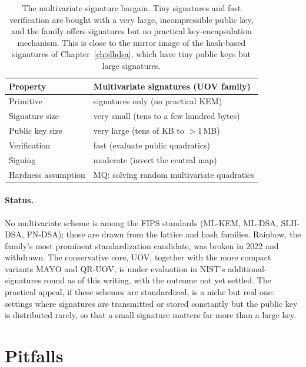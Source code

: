 \begin{table}[H]
\centering
\begin{tabular}{ll}
\toprule
Property & Multivariate signatures (UOV family) \\
\midrule
Primitive          & signatures only (no practical KEM) \\
Signature size     & very small (tens to a few hundred bytes) \\
Public key size    & very large (tens of KB to $>1$\,MB) \\
Verification       & fast (evaluate public quadratics) \\
Signing            & moderate (invert the central map) \\
Hardness assumption & MQ: solving random multivariate quadratics \\
\bottomrule
\end{tabular}
\caption{The multivariate signature bargain. Tiny signatures and fast verification are bought with a very large, incompressible public key, and the family offers signatures but no practical key-encapsulation mechanism. This is close to the mirror image of the hash-based signatures of Chapter~\ref{ch:slhdsa}, which have tiny public keys but large signatures.}
\label{tab:mv-tradeoffs}
\end{table}

\paragraph{Status.}
No multivariate scheme is among the FIPS standards (ML-KEM, ML-DSA, SLH-DSA, FN-DSA); those are drawn from the lattice and hash families. Rainbow, the family's most prominent standardization candidate, was broken in 2022 and withdrawn. The conservative core, UOV, together with the more compact variants MAYO and QR-UOV, is under evaluation in NIST's additional-signatures round as of this writing, with the outcome not yet settled. The practical appeal, if these schemes are standardized, is a niche but real one: settings where signatures are transmitted or stored constantly but the public key is distributed rarely, so that a small signature matters far more than a large key.

\section{Pitfalls}


